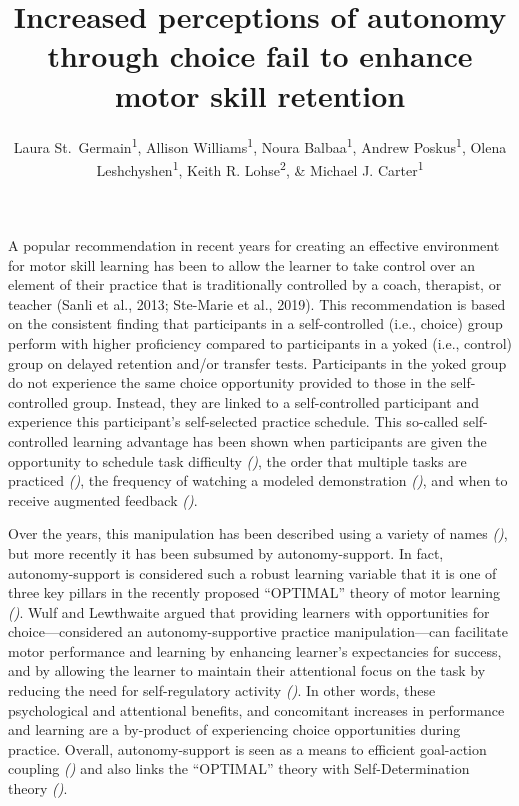 \documentclass[
  english,
  jou]{apa7}
\title{Increased perceptions of autonomy through choice fail to enhance motor skill retention}
\author{Laura St.~Germain\textsuperscript{1}, Allison Williams\textsuperscript{1}, Noura Balbaa\textsuperscript{1}, Andrew Poskus\textsuperscript{1}, Olena Leshchyshen\textsuperscript{1}, Keith R. Lohse\textsuperscript{2}, \& Michael J. Carter\textsuperscript{1}}
\date{}
\affiliation{\vspace{0.5cm}\textsuperscript{1} Department of Kinesiology, McMaster University\\\textsuperscript{2} Program in Physical Therapy, Washington University School of Medicine in Saint Louis}
\begin{document}
\maketitle

A popular recommendation in recent years for creating an effective environment for motor skill learning has been to allow the learner to take control over an element of their practice that is traditionally controlled by a coach, therapist, or teacher (Sanli et al., 2013; Ste-Marie et al., 2019). This recommendation is based on the consistent finding that participants in a self-controlled (i.e., choice) group perform with higher proficiency compared to participants in a yoked (i.e., control) group on delayed retention and/or transfer tests. Participants in the yoked group do not experience the same choice opportunity provided to those in the self-controlled group. Instead, they are linked to a self-controlled participant and experience this participant's self-selected practice schedule. This so-called self-controlled learning advantage has been shown when participants are given the opportunity to schedule task difficulty \emph{()}, the order that multiple tasks are practiced \emph{()}, the frequency of watching a modeled demonstration \emph{()}, and when to receive augmented feedback \emph{()}.

Over the years, this manipulation has been described using a variety of names \emph{()}, but more recently it has been subsumed by autonomy-support. In fact, autonomy-support is considered such a robust learning variable that it is one of three key pillars in the recently proposed ``OPTIMAL'' theory of motor learning \emph{()}. Wulf and Lewthwaite argued that providing learners with opportunities for choice---considered an autonomy-supportive practice manipulation---can facilitate motor performance and learning by enhancing learner's expectancies for success, and by allowing the learner to maintain their attentional focus on the task by reducing the need for self-regulatory activity \emph{()}. In other words, these psychological and attentional benefits, and concomitant increases in performance and learning are a by-product of experiencing choice opportunities during practice. Overall, autonomy-support is seen as a means to efficient goal-action coupling \emph{()} and also links the ``OPTIMAL'' theory with Self-Determination theory \emph{()}.
\end{document}
